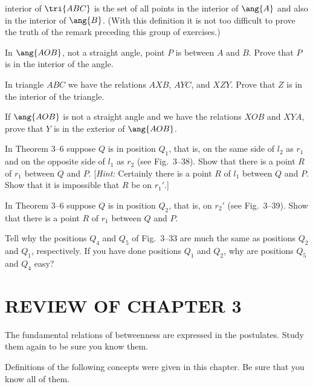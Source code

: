 \documentclass[11pt]{book}
\theoremstyle{bkplain}
\theoremstyle{XIplainnote}
\theoremstyle{bkplain}
\theoremstyle{bkplain}
\begin{document}
\begin{exercisecols}
\begin{exlist}
      interior of $\tri{ABC}$ is the set of all points in the interior of
      $\ang{A}$ and also in the interior of $\ang{B}$. (With this definition it
      is not too difficult to prove the truth of the remark preceding this group
      of exercises.)
\item In $\ang{AOB}$, not a straight angle, point $P$ is between $A$ and $B$.
      Prove that $P$ is in the interior of the angle.
\item In triangle $ABC$ we have the relations $AXB$, $AYC$, and $XZY$. Prove
      that $Z$ is in the interior of the triangle.
\item If $\ang{AOB}$ is not a straight angle and we have the relations $XOB$ and
      $XYA$, prove that $Y$ is in the exterior of $\ang{AOB}$.
\item[\stex 12.] In Theorem 3--6 suppose $Q$ is in position $Q_1$, that is, on
      the same side of $l_2$ as $r_1$ and on the opposite side of $l_1$ as $r_2$
      (see Fig.~3--38). Show that there is a point $R$ of $r_1$ between $Q$ and
      $P$. [\emph{Hint:} Certainly there is a point $R$ of $l_1$ between $Q$ and
      $P$. Show that it is impossible that $R$ be on $r_1'$.]
\exfig{\FIGIIITHIRTYEIGHT}
\item[\stex 13.] In Theorem 3--6 suppose $Q$ is in position $Q_2$, that is, on
      $r_2'$ (see Fig.~3--39). Show that there is a point $R$ of $r_1$ between
      $Q$ and $P$.
\exfig{\FIGIIITHIRTYNINE}
\item[\stex 14.] Tell why the positions $Q_4$ and $Q_5$ of Fig.~3--33 are much
      the same as positions $Q_2$ and $Q_1$, respectively. If you have done
      positions $Q_1$ and $Q_2$, why are positions $Q_5$ and $Q_4$ easy?
\end{exlist}
\end{exercisecols}

\section*{REVIEW OF CHAPTER 3}

\begin{exlist}
\item The fundamental relations of betweenness are expressed in the postulates.
      Study them again to be sure you know them.
\item Definitions of the following concepts were given in this chapter. Be sure
      that you know all of them.
\end{exlist}
\end{document}

